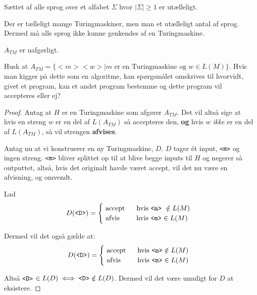 
\begin{corollary}
	Sættet af alle sprog over et alfabet $\Sigma$ hvor $|\Sigma| \ge 1$ er utælleligt.
\end{corollary}


Der er tælleligt mange Turingmaskiner, men man et utælleligt antal af sprog. Dermed må alle sprog ikke kunne genkendes af en Turingmaskine.

\begin{theorem}
	$A_{TM}$ er uafgørligt.
\end{theorem}

Husk at $A_{TM} = \{<m><w> \mid m \text{ er en Turingmaskine og } w \in L(M)\}$. Hvis man kigger på dette som en algoritme, kan spørgsmålet omskrives til hvorvidt, givet et program, kan et andet program bestemme og dette program vil accepteres eller ej?

\begin{proof}
	Antag at $H$ er en Turingmaskine som afgører $A_{TM}$. Det vil altså sige at hvis en streng $w$ er en del af $L(A_{TM})$ så accepteres den, \textbf{og} hvis $w$ \textit{ikke} er en del af $L(A_{TM})$, så vil strengen \textbf{afvises}.

	Antag nu at vi konstruerer en ny Turingmaskine, $D$. $D$ tager ét input, \texttt{<m>} og ingen streng. \texttt{<m>} bliver splittet op til at blive begge inputs til $H$ og negerer så outputtet, altså, hvis det originalt havde været accept, vil det nu være en afvisning, og omvendt.

	Lad \begin{equation*}
		D(\text{\texttt{<D>}}) =
		\begin{cases}
			\text{ accept } & \text{ hvis \texttt{<m>} } \notin L(M) \\
			\text{ afvis}   & \text{ hvis \texttt{<m>}}  \in L(M)
		\end{cases}
	\end{equation*}

	Dermed vil det også gælde at:
	\begin{equation*}
		D(\text{\texttt{<D>}}) = \begin{cases}
			\text{ accept } & \text{ hvis \texttt{<m>}}  \notin L(M) \\
			\text{ afvis }  & \text{ hvis \texttt{<m>}} \in L(M)
		\end{cases}
	\end{equation*}

	Altså \texttt{<D>} $\in L(D) \iff \text{\texttt{<D>}} \notin L(D)$.
	Dermed vil det være umuligt for $D$ at eksistere.
\end{proof}

